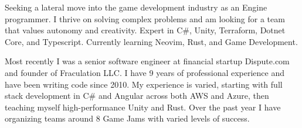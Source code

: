 

\begin{cvparagraph}


Seeking a lateral move into the game development industry as an Engine programmer.
I thrive on solving complex problems and am looking for a team that values autonomy and creativity.
Expert in C\#, Unity, Terraform, Dotnet Core, and Typescript. Currently learning Neovim, Rust, and Game Development. 

Most recently I was a senior software engineer at financial startup Dispute.com and founder of Fraculation LLC.\@
I have 9 years of professional experience and have been writing code since 2010. My experience is varied, starting with 
full stack development in C\# and Angular across both AWS and Azure, then teaching myself high-performance Unity and Rust.
Over the past year I have organizing teams around 8 Game Jams with varied levels of success.


\end{cvparagraph}
